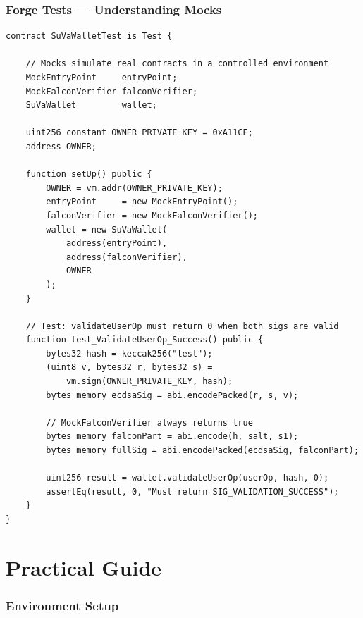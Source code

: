 \documentclass[11pt,a4paper]{article}
\begin{document}
\section{Forge Tests --- Understanding Mocks}

\begin{lstlisting}[style=solidity, caption={SuVaWallet.t.sol --- test structure}]
contract SuVaWalletTest is Test {

    // Mocks simulate real contracts in a controlled environment
    MockEntryPoint     entryPoint;
    MockFalconVerifier falconVerifier;
    SuVaWallet         wallet;

    uint256 constant OWNER_PRIVATE_KEY = 0xA11CE;
    address OWNER;

    function setUp() public {
        OWNER = vm.addr(OWNER_PRIVATE_KEY);
        entryPoint     = new MockEntryPoint();
        falconVerifier = new MockFalconVerifier();
        wallet = new SuVaWallet(
            address(entryPoint),
            address(falconVerifier),
            OWNER
        );
    }

    // Test: validateUserOp must return 0 when both sigs are valid
    function test_ValidateUserOp_Success() public {
        bytes32 hash = keccak256("test");
        (uint8 v, bytes32 r, bytes32 s) =
            vm.sign(OWNER_PRIVATE_KEY, hash);
        bytes memory ecdsaSig = abi.encodePacked(r, s, v);

        // MockFalconVerifier always returns true
        bytes memory falconPart = abi.encode(h, salt, s1);
        bytes memory fullSig = abi.encodePacked(ecdsaSig, falconPart);

        uint256 result = wallet.validateUserOp(userOp, hash, 0);
        assertEq(result, 0, "Must return SIG_VALIDATION_SUCCESS");
    }
}
\end{lstlisting}

\newpage
\part{Practical Guide}

\section{Environment Setup}
\end{document}

